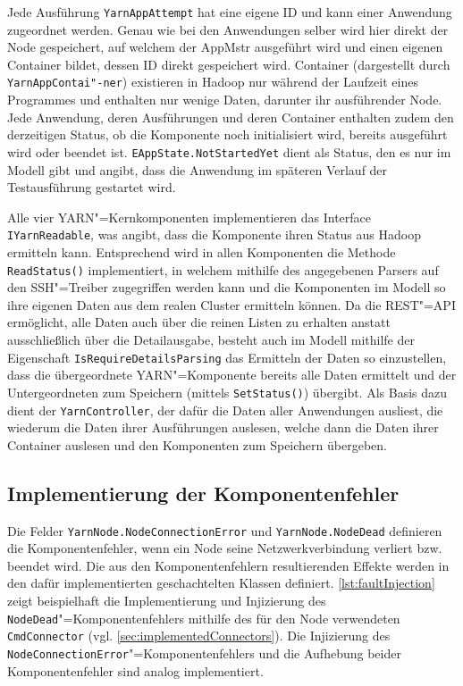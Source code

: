 Jede Ausführung \texttt{YarnAppAttempt} hat eine eigene ID und kann einer Anwendung zugeordnet werden.
Genau wie bei den Anwendungen selber wird hier direkt der Node gespeichert, auf welchem der \ac{AppMstr} ausgeführt wird und einen eigenen Container bildet, dessen ID direkt gespeichert wird.
Container (dargestellt durch \texttt{YarnAppContai"-ner}) existieren in Hadoop nur während der Laufzeit eines Programmes und enthalten nur wenige Daten, darunter ihr ausführender Node.
Jede Anwendung, deren Ausführungen und deren Container enthalten zudem den derzeitigen Status, ob die Komponente noch initialisiert wird, bereits ausgeführt wird oder beendet ist.
\texttt{EAppState.NotStartedYet} dient als Status, den es nur im Modell gibt und angibt, dass die Anwendung im späteren Verlauf der Testausführung gestartet wird.

Alle vier YARN"=Kernkomponenten implementieren das Interface \texttt{IYarnReadable}, was angibt, dass die Komponente ihren Status aus Hadoop ermitteln kann.
Entsprechend wird in allen Komponenten die Methode \texttt{ReadStatus()} implementiert, in welchem mithilfe des angegebenen Parsers auf den SSH"=Treiber zugegriffen werden kann und die Komponenten im Modell so ihre eigenen Daten aus dem realen Cluster ermitteln können.
Da die REST"=API ermöglicht, alle Daten auch über die reinen Listen zu erhalten anstatt ausschließlich über die Detailausgabe, besteht auch im Modell mithilfe der Eigenschaft \texttt{IsRequireDetailsParsing} das Ermitteln der Daten so einzustellen, dass die übergeordnete YARN"=Komponente bereits alle Daten ermittelt und der Untergeordneten zum Speichern (mittels \texttt{SetStatus()}) übergibt.
Als Basis dazu dient der \texttt{YarnController}, der dafür die Daten aller Anwendungen ausliest, die wiederum die Daten ihrer Ausführungen auslesen, welche dann die Daten ihrer Container auslesen und den Komponenten zum Speichern übergeben.

\subsection{Implementierung der Komponentenfehler}%

Die Felder \texttt{YarnNode.NodeConnectionError} und \texttt{YarnNode.NodeDead} definieren die Komponentenfehler, wenn ein Node seine Netzwerkverbindung verliert bzw. beendet wird.
Die aus den Komponentenfehlern resultierenden Effekte werden in den dafür implementierten geschachtelten Klassen definiert.
\autoref{lst:faultInjection} zeigt beispielhaft die Implementierung und Injizierung des \texttt{NodeDead}"=Komponentenfehlers mithilfe des für den Node verwendeten \texttt{CmdConnector} (vgl. \autoref{sec:implementedConnectors}).
Die Injizierung des \texttt{NodeConnectionError}"=Komponentenfehlers und die Aufhebung beider Komponentenfehler sind analog implementiert.

